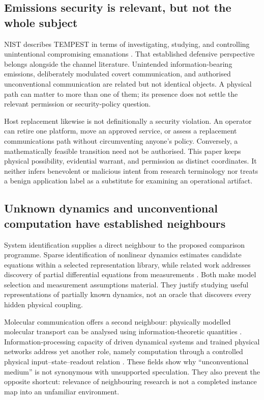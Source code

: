 \documentclass[11pt,a4paper]{article}
\theoremstyle{definition}
\theoremstyle{remark}
\begin{document}
\subsection{Emissions security is relevant, but not the whole subject}
NIST describes TEMPEST in terms of investigating, studying, and controlling unintentional compromising emanations \citep{tempest}. That established defensive perspective belongs alongside the channel literature. Unintended information-bearing emissions, deliberately modulated covert communication, and authorised unconventional communication are related but not identical objects. A physical path can matter to more than one of them; its presence does not settle the relevant permission or security-policy question.

Host replacement likewise is not definitionally a security violation. An operator can retire one platform, move an approved service, or assess a replacement communications path without circumventing anyone's policy. Conversely, a mathematically feasible transition need not be authorised. This paper keeps physical possibility, evidential warrant, and permission as distinct coordinates. It neither infers benevolent or malicious intent from research terminology nor treats a benign application label as a substitute for examining an operational artifact.

\subsection{Unknown dynamics and unconventional computation have established neighbours}
System identification supplies a direct neighbour to the proposed comparison programme. Sparse identification of nonlinear dynamics estimates candidate equations within a selected representation library, while related work addresses discovery of partial differential equations from measurements \citep{sindy,rudy}. Both make model selection and measurement assumptions material. They justify studying useful representations of partially known dynamics, not an oracle that discovers every hidden physical coupling.

Molecular communication offers a second neighbour: physically modelled molecular transport can be analysed using information-theoretic quantities \citep{eckford}. Information-processing capacity of driven dynamical systems and trained physical networks address yet another role, namely computation through a controlled physical input--state--readout relation \citep{dambre,wright}. These fields show why ``unconventional medium'' is not synonymous with unsupported speculation. They also prevent the opposite shortcut: relevance of neighbouring research is not a completed instance map into an unfamiliar environment.
\end{document}
